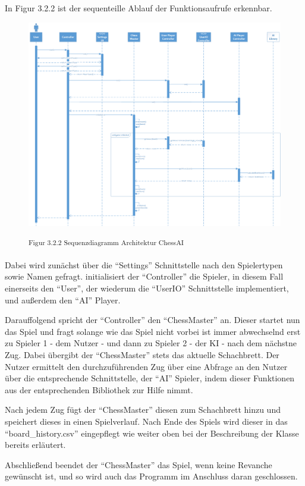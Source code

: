 In Figur 3.2.2 ist der sequenteille Ablauf der Funktionsaufrufe erkennbar.

\begin{figure}[h]
\centering
\includegraphics[width=\textwidth]{images/architecture_sequence_diagram.png}

\textsuperscript{Figur 3.2.2 Sequenzdiagramm Architektur ChessAI}
\end{figure}

Dabei wird zunächst über die ``Settings'' Schnittstelle nach den Spielertypen sowie Namen gefragt. initialisiert der ``Controller'' die Spieler, in diesem Fall einerseits den ``User'', der wiederum die ``UserIO'' Schnittstelle implementiert, und außerdem den ``AI'' Player. 

Darauffolgend spricht der ``Controller'' den ``ChessMaster'' an. Dieser startet nun das Spiel und fragt solange wie das Spiel nicht vorbei ist immer abwechselnd erst zu Spieler 1 - dem Nutzer - und dann zu Spieler 2 - der KI - nach dem nächstne Zug. Dabei übergibt der ``ChessMaster'' stets das aktuelle Schachbrett. Der Nutzer ermittelt den durchzuführenden Zug über eine Abfrage an den Nutzer über die entsprechende Schnittstelle, der ``AI'' Spieler, indem dieser Funktionen aus der entsprechenden Bibliothek zur Hilfe nimmt.

Nach jedem Zug fügt der ``ChessMaster'' diesen zum Schachbrett hinzu und speichert dieses in einen Spielverlauf. Nach Ende des Spiels wird dieser in das ``board\_history.csv'' eingepflegt wie weiter oben bei der Beschreibung der Klasse bereits erläutert.

Abschließend beendet der ``ChessMaster'' das Spiel, wenn keine Revanche gewünscht ist, und so wird auch das Programm im Anschluss daran geschlossen.


